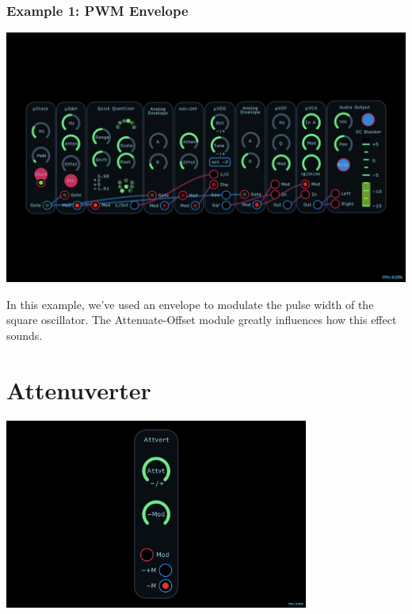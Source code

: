 \documentclass[11pt]{book}
\begin{document}
\begin{multicols*}{2}
\subsubsection*{Example 1: PWM Envelope}

\begin{center}
\includegraphics[width=0.95\linewidth]{attenuate-offset-fig4.png}
\end{center}

In this example, we've used an envelope to modulate the pulse width of the square oscillator. The Attenuate-Offset module greatly influences how this effect sounds.

\end{multicols*}

\pagebreak


\section{Attenuverter}

\begin{center}
\includegraphics[width=0.75\textwidth]{attenuverter.png}
\end{center}
\end{document}
